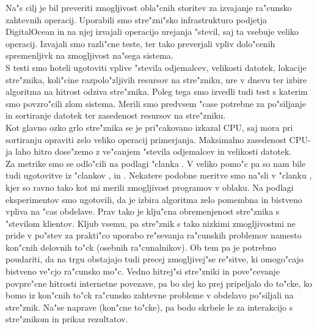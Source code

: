 Na"s cilj je bil preveriti zmogljivost obla"cnih storitev za izvajanje ra"cunsko zahtevnih operacij. Uporabili smo stre"zni"sko infrastrukturo podjetja DigitalOcean in na njej izvajali operacijo urejanja "stevil, saj ta vsebuje veliko operacij.
Izvajali smo razli"cne teste, ter tako preverjali vpliv dolo"cenih spremenljivk na zmogljivost na"sega sistema. \\
S testi smo hoteli ugotoviti vplive "stevila odjemalcev, velikosti datotek, lokacije stre"znika, koli"cine razpolo"zljivih resursov na stre"zniku, ure v dnevu ter izbire algoritma na hitrost odziva stre"znika. Poleg tega smo izvedli tudi test s katerim smo povzro"cili zlom sistema.
Merili smo predvsem "case potrebne za po"siljanje in sortiranje datotek ter zasedenost resursov na stre"zniku.\\
Kot glavno ozko grlo stre"znika se je pri"cakovano izkazal CPU, saj mora pri sortiranju opraviti zelo veliko operacij primerjanja. Maksimalno zasedenost CPU-ja laho hitro dose"zemo z ve"canjem "stevila odjemalcev in velikosti datotek.\\
Za metrike smo se odlo"cili na podlagi "clanka \cite{8_ibm_metrics}. V veliko pomo"c pa so nam bile tudi ugotovitve iz "clankov \cite{8_performance_challenges}, \cite{8_performance_analysis} in \cite{8_performance_evaluation}.
Nekatere podobne meritve smo na"sli v "clanku \cite{8_performance_testing}, kjer so ravno tako kot mi merili zmogljivost programov v oblaku.
Na podlagi eksperimentov smo ugotovili, da je izbira algoritma zelo pomembna in bistveno vpliva na "cas obdelave. Prav tako je klju"cna obremenjenost stre"znika s "stevilom klientov.
Kljub vsemu, pa stre"znik s tako nizkimi zmogljivostmi ne pride v po"stev za prakti"co uporabo re"sevanja ra"cunskih problemov namesto kon"cnih delovnih to"ck (osebnih ra"cunalnikov). Ob tem pa je potrebno poudariti, da na trgu obstajajo tudi precej
zmogljivej"se re"sitve, ki omogo"cajo bistveno ve"cjo ra"cunsko mo"c. Vedno hitrej"si stre"zniki in pove"cevanje povpre"cne hitrosti internetne povezave, pa bo slej ko prej pripeljalo do to"cke, ko bomo iz kon"cnih to"ck ra"cunsko zahtevne probleme v obdelavo po"siljali na stre"znik. Na"se naprave (kon"cne to"cke), pa bodo skrbele le za interakcijo s stre"znikom in prikaz rezultatov. 
